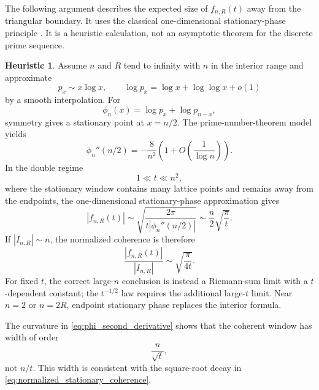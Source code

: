 \documentclass[11pt]{amsart}
\numberwithin{equation}{section}
\theoremstyle{plain}
\theoremstyle{definition}
\newtheorem{heuristic}[theorem]{Heuristic}
\theoremstyle{remark}
\begin{document}
The following argument describes the expected size of $f_{n,R}(t)$ away from the triangular boundary.  It uses the classical one-dimensional stationary-phase principle \cite{Olver1974}.  It is a heuristic calculation, not an asymptotic theorem for the discrete prime sequence.

\begin{heuristic}
\label{heur:stationary_phase_prime_ranks}
Assume $n$ and $R$ tend to infinity with $n$ in the interior range and approximate
\begin{equation}
p_x\sim x\log x,
\qquad
\log p_x=\log x+\log\log x+o(1)
\label{eq:nth_prime_heuristic}
\end{equation}
by a smooth interpolation.  For
\begin{equation}
\phi_n(x)=\log p_x+\log p_{n-x},
\label{eq:phi_n_definition}
\end{equation}
symmetry gives a stationary point at $x=n/2$.  The prime-number-theorem model yields
\begin{equation}
\phi_n''(n/2)
=-\frac{8}{n^2}
\left(1+O\left(\frac1{\log n}\right)\right).
\label{eq:phi_second_derivative}
\end{equation}
In the double regime
\begin{equation}
1\ll t\ll n^2,
\label{eq:stationary_phase_regime}
\end{equation}
where the stationary window contains many lattice points and remains away from the endpoints, the one-dimensional stationary-phase approximation gives
\begin{equation}
|f_{n,R}(t)|
\sim
\sqrt{\frac{2\pi}{t|\phi_n''(n/2)|}}
\sim
\frac n2\sqrt{\frac{\pi}{t}}.
\label{eq:fn_stationary_asymptotic}
\end{equation}
If $|I_{n,R}|\sim n$, the normalized coherence is therefore
\begin{equation}
\frac{|f_{n,R}(t)|}{|I_{n,R}|}
\sim
\sqrt{\frac{\pi}{4t}}.
\label{eq:normalized_stationary_coherence}
\end{equation}
For fixed $t$, the correct large-$n$ conclusion is instead a Riemann-sum limit with a $t$-dependent constant; the $t^{-1/2}$ law requires the additional large-$t$ limit.  Near $n=2$ or $n=2R$, endpoint stationary phase replaces the interior formula.
\end{heuristic}

The curvature in \eqref{eq:phi_second_derivative} shows that the coherent window has width of order
\begin{equation}
\frac{n}{\sqrt t},
\label{eq:stationary_window_width}
\end{equation}
not $n/t$.  This width is consistent with the square-root decay in \eqref{eq:normalized_stationary_coherence}.
\end{document}

